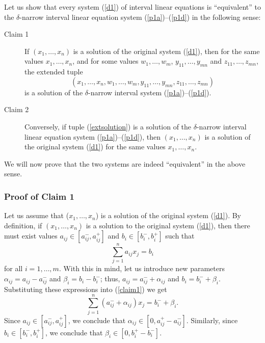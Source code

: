 Let us show that every system (\ref{d1}) of interval linear equations is
``equivalent'' to the $\delta$-narrow interval linear equation system
(\ref{p1a})--(\ref{p1d}) in the following sense:
\begin{description}
  \item[Claim 1] If $(x_1,\ldots,x_n)$ is a solution of the original system
    (\ref{d1}), then for the same values $x_1,\ldots,x_n$, and for some values
    $w_1,\ldots,w_m$, $y_{11},\ldots,y_{mn}$ and $z_{11},\ldots,z_{mn}$, the 
    extended tuple
    \begin{equation}
       (x_1,\ldots,x_n,w_1,\ldots,w_m,y_{1 1},\ldots,y_{m n},
        z_{1 1},\ldots,z_{m n}) \label{extsolution}
    \end{equation}
    is a solution of the $\delta$-narrow interval system
    (\ref{p1a})--(\ref{p1d}).
  \item[Claim 2] Conversely, if tuple (\ref{extsolution}) is a solution of the
    $\delta$-narrow interval linear equation system (\ref{p1a})--(\ref{p1d}),
    then $(x_1,\ldots,x_n)$ is a solution of the original system (\ref{d1})
    for the same values $x_1,\ldots,x_n$.
\end{description}
We will now prove that the two systems are indeed ``equivalent'' in the above
sense.

\subsubsection{Proof of Claim 1}
Let us assume that ($x_1,\ldots,x_n$) is a solution of the
original system (\ref{d1}).  By definition, 
if $(x_1,\ldots,x_n)$ is a solution to the original system (\ref{d1}), then
there must exist values $a_{ij}\in[a_{ij}^-,a_{ij}^+]$ and
$b_i\in[b_i^-,b_i^+]$ such that
\begin{equation}
  \sum_{j=1}^n a_{ij} x_j = b_i \label{claim1}
\end{equation}
for all $i=1,\ldots,m$.  With this in mind, let us introduce new parameters
$\alpha_{ij}=a_{ij}-a_{ij}^-$ and $\beta_i=b_i-b_i^-$; thus, $a_{ij}=a_{ij}^-+
\alpha_{ij}$ and $b_i=b_i^-+\beta_i$.  Substituting these expressions into
(\ref{claim1}) we get
\begin{equation}
  \sum_{j=1}^n (a_{ij}^-+\alpha_{ij}) x_j = b_i^-+\beta_i. \label{newsolution}
\end{equation}
Since $a_{ij}\in[a_{ij}^-,a_{ij}^+]$, we conclude that 
$\alpha_{ij}\in[0,a_{ij}^+-a_{ij}^-]$.  Similarly, since
$b_i\in[b_i^-,b_i^+]$, we conclude that $\beta_i\in[0,b_i^+-b_i^-]$.

